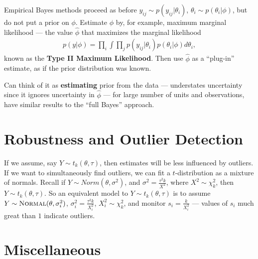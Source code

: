 \begin{defn}
  \label{sec:heirachcial-models-4}
  Empirical Bayes methods proceed as before $y_{ij} \sim p(y_{ij} |
  \theta_{i})$, $\theta_{i} \sim p(\theta_{i} | \phi)$, but do not put
  a prior on $\phi$. Estimate $\phi$ by, for example, maximum marginal
  likelihood --- the value $\hat \phi$ that maximizes the marginal
  likelihood
  \begin{align}
    \label{eq:22}
    p(y | \phi) = \prod_{i} \int \prod_{j} p(y_{ij} | \theta_{i})
    p(\theta_{i} | \phi) d \theta_{i},
  \end{align} known as the \textbf{Type II Maximum Likelihood}. Then
  use $\hat \phi$ as a ``plug-in'' estimate, as if the prior
  distribution was known.

  Can think of it as \textbf{estimating} prior from the data ---
  understates uncertainty since it ignores uncertainty in $\hat \phi$
  --- for large number of units and observations, have similar results
  to the ``full Bayes'' approach.
\end{defn}


\section{Robustness and Outlier Detection}
\label{sec:robustn-outl-detect}

\begin{defn}
  \label{sec:robustn-outl-detect-1}
  If we assume, say $Y \sim t_{k}(\theta, \tau)$, then estimates will
  be less influenced by outliers. If we want to simultaneously find
  outliers, we can fit a $t$-distribution as a mixture of normals.
  Recall if $Y \sim Norm(\theta, \sigma^{2})$, and $\sigma^{2} =
  \frac{\tau^{2} k}{X^{2}} $, where $X^{2} \sim \chi^{2}_{k}$, then $Y
  \sim t_{k}(\theta, \tau)$. So an equivalent model to $Y \sim
  t_{k}(\theta, \tau)$ is to assume $Y \sim \textsc{Normal}(\theta,
  \sigma_{i}^{2})$, $\sigma_{i}^{2} = \frac{\tau^{2} k }{X_{i}^{2}} $,
  $X_{i}^{2} \sim \chi^{2}_{k}$, and monitor $s_{i} =
  \frac{k}{X_{i}^{2}} $ --- values of $s_{i}$ much great than $1$
  indicate outliers.
\end{defn}

\section{Miscellaneous}
\label{sec:miscelaneous}

